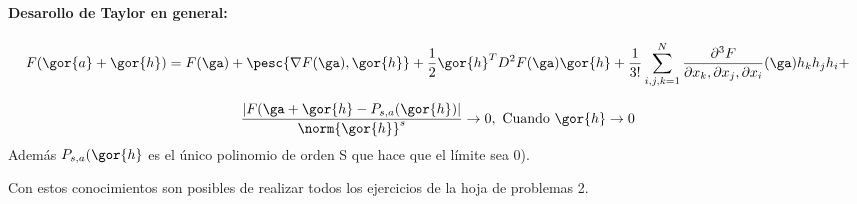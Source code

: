 \paragraph{Desarollo de Taylor en general:}

$$F(\gor{a}+\gor{h}) = F(\ga) + \pesc{\nabla F(\ga),\gor{h}} + \frac{1}{2} \gor{h}^T D^2F(\ga)\gor{h} + \frac{1}{3!}\sum_{i,j,k=1}^N \frac{\partial^3F}{\partial x_k,\partial x_j, \partial x_i} (\ga) h_kh_jh_i + $$

\begin{theorem}
 $$\frac{|F(\ga+\gor{h} - P_{s,a}(\gor{h})|}{\norm{\gor{h}}^s} \rightarrow 0, \text{ Cuando } \gor{h} \rightarrow 0$$
 Además $P_{s,a}(\gor{h}$ es el único polinomio de orden S que hace que el límite sea 0).
\end{theorem}

Con estos conocimientos son posibles de realizar todos los ejercicios de la hoja de problemas 2.
